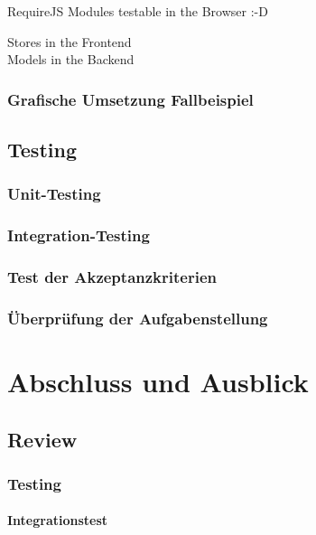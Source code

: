 \documentclass[oneside,11pt,parskip=half,ngerman]{scrreprt}
\begin{document}
RequireJS Modules testable in the Browser :-D

Stores in the Frontend\\Models in the Backend

\section{Grafische Umsetzung
Fallbeispiel}\label{grafische-umsetzung-fallbeispiel}

\chapter{Testing}\label{testing}

\section{Unit-Testing}\label{unit-testing}

\section{Integration-Testing}\label{integration-testing}

\section{Test der Akzeptanzkriterien}\label{test-der-akzeptanzkriterien}

\section{Überprüfung der
Aufgabenstellung}\label{uxfcberpruxfcfung-der-aufgabenstellung}

\part[Teil iv]{Abschluss und Ausblick}

\chapter{Review}\label{review}

\section{Testing}\label{testing-1}

\subsection{Integrationstest}\label{integrationstest}
\end{document}
